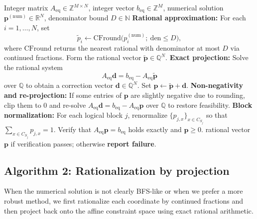 \documentclass[pdflatex,sn-nature]{sn-jnl}%
\theoremstyle{thmstyleone}%
\theoremstyle{thmstyletwo}%
\theoremstyle{thmstylethree}%
\begin{document}
\begin{appendices}
\begin{algorithm}[t]
    \caption{Rationalize by projection}
    \label{alg:ratproj-supp}
    \begin{algorithmic}[1]
        \Require Integer matrix $A_{\mathrm{eq}} \in \mathbb Z^{M\times N}$,
                 integer vector $b_{\mathrm{eq}}\in\mathbb Z^M$,
                 numerical solution $\mathbf{p}^{(\mathrm{num})}\in\mathbb R^N$,
                 denominator bound $D\in\mathbb N$
        \State \textbf{Rational approximation:}
               For each $i=1,\dots,N$, set
               \[
                   \tilde{p}_i \gets \mathrm{CFround}\bigl(p^{(\mathrm{num})}_i;\ \mathrm{den}\le D\bigr),
               \]
               where $\mathrm{CFround}$ returns the nearest rational with denominator at most $D$ via continued fractions.
        \State Form the rational vector $\tilde{\mathbf p}\in\mathbb Q^N$.
        \State \textbf{Exact projection:}
               Solve the rational system
               \[
                   A_{\mathrm{eq}}\mathbf{d}=b_{\mathrm{eq}}-A_{\mathrm{eq}}\tilde{\mathbf{p}}
               \]
               over $\mathbb Q$ to obtain a correction vector $\mathbf d\in\mathbb Q^N$.
        \State Set $\mathbf{p}\gets \tilde{\mathbf{p}}+\mathbf{d}$.
        \State \textbf{Non-negativity and re-projection:}
               If some entries of $\mathbf p$ are slightly negative due to rounding, clip them to $0$ and re-solve
               $A_{\mathrm{eq}}\mathbf{d}=b_{\mathrm{eq}}-A_{\mathrm{eq}}\mathbf{p}$ over $\mathbb Q$ to restore feasibility.
        \State \textbf{Block normalization:}
               For each logical block $j$, renormalize $\{p_{j,x}\}_{x\in C_{S_j}}$ so that
               $\sum_{x\in C_{S_j}}p_{j,x}=1$.
        \State Verify that $A_{\mathrm{eq}}\mathbf{p}=b_{\mathrm{eq}}$ holds exactly and $\mathbf{p}\ge 0$.
        \State \Return rational vector $\mathbf{p}$ if verification passes; otherwise \textbf{report failure}.
    \end{algorithmic}
\end{algorithm}

\subsection{Algorithm 2: Rationalization by projection}

When the numerical solution is not clearly BFS-like or when we prefer a more robust method, we first rationalize each coordinate by continued fractions and then project back onto the affine constraint space using exact rational arithmetic.


\end{appendices}
\end{document}
